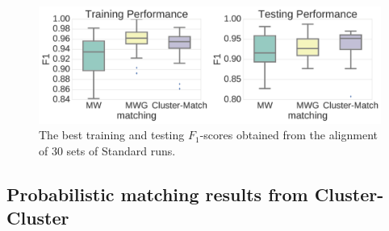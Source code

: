 \begin{figure}[!htbp]
\centering\includegraphics[width=1.0\linewidth]{05-precursor-cluster/figures/fig3.pdf}
\caption{\label{fig:pairwise-training-testing} The best training and testing $F_1$-scores obtained from the alignment of 30 sets of Standard runs.}
\end{figure}


\subsection{Probabilistic matching results from Cluster-Cluster}

